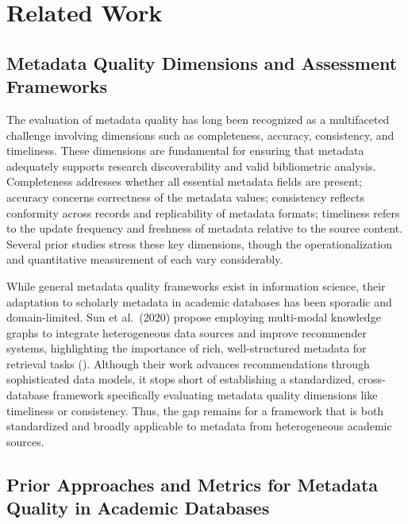 \documentclass[
  12pt,
]{article}
\begin{document}
\section{Related Work}\label{related-work}

\subsection{Metadata Quality Dimensions and Assessment
Frameworks}\label{metadata-quality-dimensions-and-assessment-frameworks}

The evaluation of metadata quality has long been recognized as a
multifaceted challenge involving dimensions such as completeness,
accuracy, consistency, and timeliness. These dimensions are fundamental
for ensuring that metadata adequately supports research discoverability
and valid bibliometric analysis. Completeness addresses whether all
essential metadata fields are present; accuracy concerns correctness of
the metadata values; consistency reflects conformity across records and
replicability of metadata formats; timeliness refers to the update
frequency and freshness of metadata relative to the source content.
Several prior studies stress these key dimensions, though the
operationalization and quantitative measurement of each vary
considerably.

While general metadata quality frameworks exist in information science,
their adaptation to scholarly metadata in academic databases has been
sporadic and domain-limited. Sun et al.~(2020) propose employing
multi-modal knowledge graphs to integrate heterogeneous data sources and
improve recommender systems, highlighting the importance of rich,
well-structured metadata for retrieval tasks (). Although their work advances recommendations through
sophisticated data models, it stops short of establishing a
standardized, cross-database framework specifically evaluating metadata
quality dimensions like timeliness or consistency. Thus, the gap remains
for a framework that is both standardized and broadly applicable to
metadata from heterogeneous academic sources.

\subsection{Prior Approaches and Metrics for Metadata Quality in
Academic
Databases}\label{prior-approaches-and-metrics-for-metadata-quality-in-academic-databases}
\end{document}

